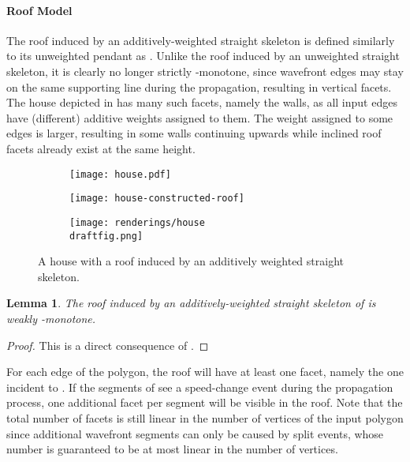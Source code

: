 \documentclass[preprint]{elsarticle}
\newtheorem{lemma}{Lemma}
\newcommand{\draftfig}{.small}
\begin{document}
\paragraph{Roof Model}

The roof induced by an additively-weighted straight skeleton is defined similarly
to its unweighted pendant as
.
Unlike the roof induced by an unweighted straight skeleton, it is clearly no
longer strictly -monotone, since wavefront edges may stay on the same
supporting line during the propagation, resulting in vertical facets.  The
house depicted in  has many such facets, namely the walls, as
all input edges have (different) additive weights assigned to them.  The
weight assigned to some edges is larger, resulting in some walls continuing
upwards while inclined roof facets already exist at the same height.


\begin{figure}[ht!]
  \centering

  \begin{subfigure}[b]{0.90\textwidth}
    \centering
    \texttt{[image: house.pdf]}
    \caption[]{}
    \label{fig:house-floor-plan}
  \end{subfigure}

  \begin{subfigure}[b]{0.48\textwidth}
    \centering
    \texttt{[image: house-constructed-roof]}
    \caption[]{}
    \label{fig:house-constructed-roof}
  \end{subfigure}
  \hspace{0.1em}
  \begin{subfigure}[b]{0.48\textwidth}
    \centering
    \texttt{[image: renderings/house\\draftfig.png]}
    \caption[]{}
    \label{fig:house-render}
  \end{subfigure}

  \caption{A house with a  roof induced by an additively weighted straight skeleton.
  }
  \label{fig:house}
\end{figure}

\begin{lemma}
  The roof  induced by an additively-weighted straight
  skeleton of  is weakly -monotone.
\end{lemma}
\begin{proof}
  This is a direct consequence of .
\end{proof}

For each edge  of the polygon, the roof will have at least one facet,
namely the one incident to .  If the segments of  see a speed-change
event during the propagation process, one additional facet per segment
will be visible in the roof.
Note that the total number of facets is still linear in the number of
vertices of the input polygon since additional wavefront segments can
only be caused by split events, whose number is guaranteed to be at
most linear in the number of vertices.
\end{document}
